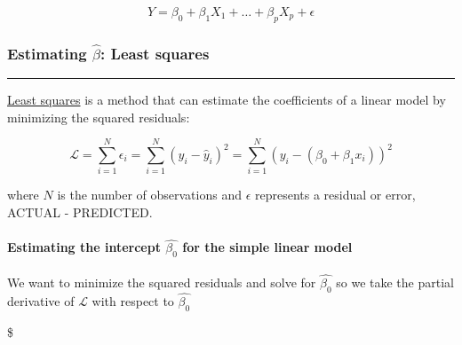 \documentclass[11pt]{article}
\begin{document}
\[ Y = \beta_0 + \beta_1 X_1 + \ldots + \beta_p X_p + \epsilon\]

\subsubsection{\texorpdfstring{Estimating \(\hat\beta\): Least
squares}{Estimating \textbackslash{}hat\textbackslash{}beta: Least squares}}\label{estimating-hatbeta-least-squares}

\begin{center}\rule{0.5\linewidth}{\linethickness}\end{center}

\href{http://en.wikipedia.org/wiki/Least_squares}{Least squares} is a
method that can estimate the coefficients of a linear model by
minimizing the squared residuals:

\[ \mathscr{L} = \sum_{i=1}^N \epsilon_i = \sum_{i=1}^N \left( y_i - \hat{y}_i \right)^2  = \sum_{i=1}^N \left(y_i - \left(\beta_0 + \beta_1 x_i\right)\right)^2 \]

where \(N\) is the number of observations and \(\epsilon\) represents a
residual or error, ACTUAL - PREDICTED.

\paragraph{\texorpdfstring{Estimating the intercept \(\hat{\beta_0}\)
for the simple linear
model}{Estimating the intercept \textbackslash{}hat\{\textbackslash{}beta\_0\} for the simple linear model}}\label{estimating-the-intercept-hatbeta_0-for-the-simple-linear-model}

We want to minimize the squared residuals and solve for
\(\hat{\beta_0}\) so we take the partial derivative of \(\mathscr{L}\)
with respect to \(\hat{\beta_0}\)

    \$
\end{document}
